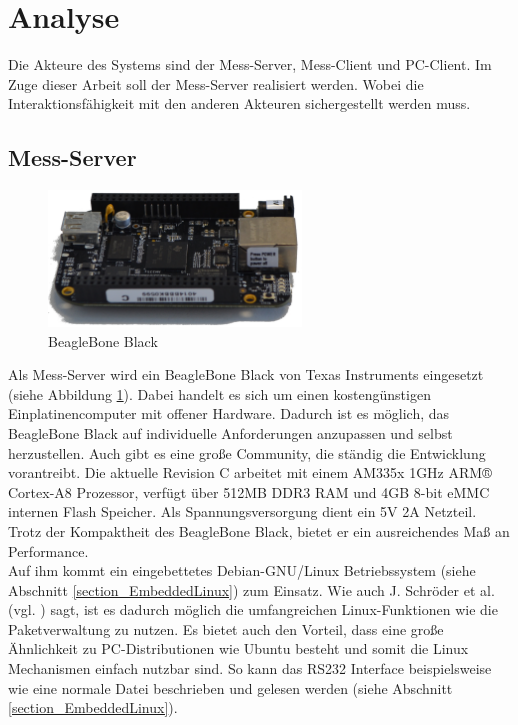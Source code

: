 \section{Analyse}

Die Akteure des Systems sind der Mess-Server, Mess-Client und PC-Client. Im Zuge dieser Arbeit soll der Mess-Server realisiert werden. Wobei die Interaktionsfähigkeit mit den anderen Akteuren sichergestellt werden muss.


\subsection{Mess-Server}
\label{section_Mess-Server}

\begin{figure}[H]
\begin{center}
\includegraphics[width=0.6\textwidth]{img/general/BeagleBoneBlack.png}
\caption{BeagleBone Black}
\label{figure_Beagleboneblack}
\end{center}
\end{figure}


Als Mess-Server wird ein BeagleBone Black von Texas Instruments eingesetzt (siehe Abbildung \ref{figure_Beagleboneblack}). Dabei handelt es sich um einen kostengünstigen Einplatinencomputer mit offener Hardware. Dadurch ist es möglich, das BeagleBone Black auf individuelle Anforderungen anzupassen und selbst herzustellen. Auch gibt es eine große Community, die ständig die Entwicklung vorantreibt.
Die aktuelle Revision C arbeitet mit einem AM335x 1GHz ARM® Cortex-A8 Prozessor, verfügt über 512MB DDR3 RAM und 4GB 8-bit eMMC internen Flash Speicher. Als Spannungsversorgung dient ein 5V 2A Netzteil. Trotz der Kompaktheit des BeagleBone Black, bietet er ein ausreichendes Maß an Performance.\\
Auf ihm kommt ein eingebettetes Debian-GNU/Linux Betriebssystem (siehe Abschnitt \ref{section_EmbeddedLinux}) zum Einsatz. Wie auch J. Schröder et al. (vgl. \cite{schroeder2009embedded}) sagt, ist es dadurch möglich die umfangreichen Linux-Funktionen wie die Paketverwaltung zu nutzen. Es bietet auch den Vorteil, dass eine große Ähnlichkeit zu PC-Distributionen wie Ubuntu besteht und somit die Linux Mechanismen einfach nutzbar sind. So kann das RS232 Interface beispielsweise wie eine normale Datei beschrieben und gelesen werden (siehe Abschnitt \ref{section_EmbeddedLinux}).

